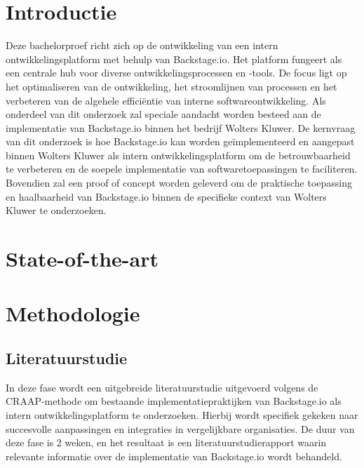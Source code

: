 
\section{Introductie}%
\label{sec:introductie}
Deze bachelorproef richt zich op de ontwikkeling van een intern ontwikkelingsplatform met behulp van Backstage.io. Het platform fungeert als een centrale hub voor diverse ontwikkelingsprocessen en -tools. De focus ligt op het optimaliseren van de ontwikkeling, het stroomlijnen van processen en het verbeteren van de algehele efficiëntie van interne softwareontwikkeling. Als onderdeel van dit onderzoek zal speciale aandacht worden besteed aan de implementatie van Backstage.io binnen het bedrijf Wolters Kluwer. De kernvraag van dit onderzoek is hoe Backstage.io kan worden geïmplementeerd en aangepast binnen Wolters Kluwer als intern ontwikkelingsplatform om de betrouwbaarheid te verbeteren en de soepele implementatie van softwaretoepassingen te faciliteren. Bovendien zal een proof of concept worden geleverd om de praktische toepassing en haalbaarheid van Backstage.io binnen de specifieke context van Wolters Kluwer te onderzoeken.







\section{State-of-the-art}%
\label{sec:state-of-the-art}


\section{Methodologie}%
\label{sec:methodologie}
\subsection{Literatuurstudie}
In deze fase wordt een uitgebreide literatuurstudie uitgevoerd volgens de CRAAP-methode om bestaande implementatiepraktijken van Backstage.io als intern ontwikkelingsplatform te onderzoeken. Hierbij wordt specifiek gekeken naar succesvolle aanpassingen en integraties in vergelijkbare organisaties. De duur van deze fase is 2 weken, en het resultaat is een literatuurstudierapport waarin relevante informatie over de implementatie van Backstage.io wordt behandeld.

